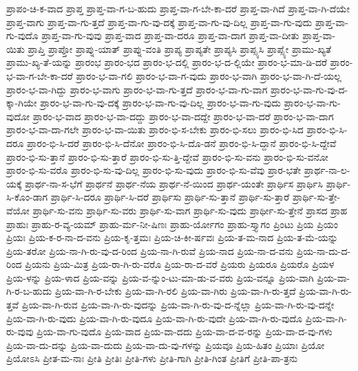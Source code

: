 {ಪ್ರಾಪಂ-ಚಿ-ಕ-ವಾದ
ಪ್ರಾಪ್ತ
ಪ್ರಾಪ್ತ-ವಾ-ಗ-ಬ-ಹುದು
ಪ್ರಾಪ್ತ-ವಾ-ಗ-ಬೇ-ಕಾ-ದರೆ
ಪ್ರಾಪ್ತ-ವಾ-ಗಿದೆ
ಪ್ರಾಪ್ತ-ವಾ-ಗಿ-ದೆಯೇ
ಪ್ರಾಪ್ತ-ವಾಗು
ಪ್ರಾಪ್ತ-ವಾ-ಗು-ತ್ತದೆ
ಪ್ರಾಪ್ತ-ವಾ-ಗು-ವು-ದಕ್ಕೆ
ಪ್ರಾಪ್ತ-ವಾ-ಗು-ವು-ದಿಲ್ಲ
ಪ್ರಾಪ್ತ-ವಾ-ಗು-ವುದು
ಪ್ರಾಪ್ತ-ವಾ-ಗು-ವುದೊ
ಪ್ರಾಪ್ತ-ವಾ-ಗು-ವುವು
ಪ್ರಾಪ್ತ-ವಾದ
ಪ್ರಾಪ್ತ-ವಾ-ದರೂ
ಪ್ರಾಪ್ತ-ವಾ-ದಾಗ
ಪ್ರಾಪ್ತ-ವಾ-ದೀತು
ಪ್ರಾಪ್ತ-ವಾ-ಯಿತು
ಪ್ರಾಪ್ತಿ
ಪ್ರಾಪ್ತೋ
ಪ್ರಾಪ್ನು-ಯಾತ್
ಪ್ರಾಪ್ನು-ವಂತಿ
ಪ್ರಾಪ್ಯ
ಪ್ರಾಪ್ಯತೇ
ಪ್ರಾಪ್ಯಸಿ
ಪ್ರಾಪ್ಸ್ಯಸಿ
ಪ್ರಾಪ್ಸ್ಯೇ
ಪ್ರಾಮು-ಖ್ಯತೆ
ಪ್ರಾಮು-ಖ್ಯ-ತೆ-ಯನ್ನು
ಪ್ರಾರಂಭ
ಪ್ರಾರಂ-ಭದ
ಪ್ರಾರಂ-ಭ-ದಲ್ಲಿ
ಪ್ರಾರಂ-ಭ-ದ-ಲ್ಲಿಯೇ
ಪ್ರಾರಂ-ಭ-ಮಾ-ಡಿ-ದರೆ
ಪ್ರಾರಂ-ಭ-ವಾ-ಗ-ಬೇ-ಕಾ-ದರೆ
ಪ್ರಾರಂ-ಭ-ವಾ-ಗಲಿ
ಪ್ರಾರಂ-ಭ-ವಾ-ಗ-ವುದು
ಪ್ರಾರಂ-ಭ-ವಾಗಿ
ಪ್ರಾರಂ-ಭ-ವಾ-ಗಿ-ದೆ-ಯಲ್ಲ
ಪ್ರಾರಂ-ಭ-ವಾ-ಗಿದ್ದು
ಪ್ರಾರಂ-ಭ-ವಾಗು
ಪ್ರಾರಂ-ಭ-ವಾ-ಗು-ತ್ತದೆ
ಪ್ರಾರಂ-ಭ-ವಾ-ಗು-ವಾಗ
ಪ್ರಾರಂ-ಭ-ವಾ-ಗು-ವು-ದ-ಕ್ಕಾ-ಗಿಯೇ
ಪ್ರಾರಂ-ಭ-ವಾ-ಗು-ವು-ದಕ್ಕೆ
ಪ್ರಾರಂ-ಭ-ವಾ-ಗು-ವು-ದಿಲ್ಲ
ಪ್ರಾರಂ-ಭ-ವಾ-ಗು-ವುದು
ಪ್ರಾರಂ-ಭ-ವಾ-ಗು-ವುದೋ
ಪ್ರಾರಂ-ಭ-ವಾದ
ಪ್ರಾರಂ-ಭ-ವಾ-ದದ್ದು
ಪ್ರಾರಂ-ಭ-ವಾ-ದದ್ದೇ
ಪ್ರಾರಂ-ಭ-ವಾ-ದರೆ
ಪ್ರಾರಂ-ಭ-ವಾ-ದಾಗ
ಪ್ರಾರಂ-ಭ-ವಾ-ದಾ-ಗಲೇ
ಪ್ರಾರಂ-ಭ-ವಾ-ಯಿತು
ಪ್ರಾರಂ-ಭಿ-ಸ-ಬೇಕು
ಪ್ರಾರಂ-ಭಿ-ಸಲು
ಪ್ರಾರಂ-ಭಿ-ಸಿದ
ಪ್ರಾರಂ-ಭಿ-ಸಿ-ದರೂ
ಪ್ರಾರಂ-ಭಿ-ಸಿ-ದರೆ
ಪ್ರಾರಂ-ಭಿ-ಸಿ-ದೆನೋ
ಪ್ರಾರಂ-ಭಿ-ಸಿ-ದೊ-ಡನೆ
ಪ್ರಾರಂ-ಭಿ-ಸಿ-ದ್ದಾನೆ
ಪ್ರಾರಂ-ಭಿ-ಸಿ-ದ್ದೇವೆ
ಪ್ರಾರಂ-ಭಿ-ಸು-ತ್ತಾನೆ
ಪ್ರಾರಂ-ಭಿ-ಸು-ತ್ತಾರೆ
ಪ್ರಾರಂ-ಭಿ-ಸು-ತ್ತಿ-ದ್ದೇವೆ
ಪ್ರಾರಂ-ಭಿ-ಸು-ವನು
ಪ್ರಾರಂ-ಭಿ-ಸು-ವನೋ
ಪ್ರಾರಂ-ಭಿ-ಸು-ವರೊ
ಪ್ರಾರಂ-ಭಿ-ಸು-ವು-ದಿಲ್ಲ
ಪ್ರಾರಂ-ಭಿ-ಸು-ವುದು
ಪ್ರಾರಂ-ಭಿ-ಸು-ವೆವು
ಪ್ರಾರ-ಭತೇ
ಪ್ರಾರ್ಥ-ನಾ-ಲ-ಯಕ್ಕೆ
ಪ್ರಾರ್ಥ-ನಾ-ಸ-ಭೆಗೆ
ಪ್ರಾರ್ಥನೆ
ಪ್ರಾರ್ಥ-ನೆಯ
ಪ್ರಾರ್ಥ-ನೆ-ಯಿಂದ
ಪ್ರಾರ್ಥ-ಯಂತೇ
ಪ್ರಾರ್ಥಿಸ
ಪ್ರಾರ್ಥಿಸಿ
ಪ್ರಾರ್ಥಿ-ಸಿ-ಕೊಂ-ಡಾಗ
ಪ್ರಾರ್ಥಿ-ಸಿ-ದರೂ
ಪ್ರಾರ್ಥಿ-ಸಿ-ದರೆ
ಪ್ರಾರ್ಥಿಸು
ಪ್ರಾರ್ಥಿ-ಸು-ತ್ತಾನೆ
ಪ್ರಾರ್ಥಿ-ಸು-ತ್ತಾರೆ
ಪ್ರಾರ್ಥಿ-ಸು-ತ್ತೇ-ವೆಯೋ
ಪ್ರಾರ್ಥಿ-ಸು-ವನು
ಪ್ರಾರ್ಥಿ-ಸು-ವರು
ಪ್ರಾರ್ಥಿ-ಸು-ವಾಗ
ಪ್ರಾರ್ಥಿ-ಸು-ವುದು
ಪ್ರಾರ್ಥೀ-ಸು-ತ್ತೇನೆ
ಪ್ರಾಸದ
ಪ್ರಾಹ
ಪ್ರಾಹುಃ
ಪ್ರಾಹು-ರ-ವ್ಯ-ಯಮ್
ಪ್ರಾಹು-ರ್ಮ-ನೀ-ಷಿಣಃ
ಪ್ರಾಹು-ರ್ಯೋಗಂ
ಪ್ರಾಹು-ಸ್ತ್ಯಾಗಂ
ಪ್ರಿಂಟು
ಪ್ರಿಯ
ಪ್ರಿಯಂ
ಪ್ರಿಯಃ
ಪ್ರಿಯ-ಕ-ರ-ನಾ-ದ-ವನು
ಪ್ರಿಯ-ಕೃ-ತ್ತಮಃ
ಪ್ರಿಯ-ಚಿ-ಕೀ-ರ್ಷವಃ
ಪ್ರಿಯ-ತ-ಮ-ನಾದ
ಪ್ರಿಯ-ತ-ಮೆ-ಯನ್ನು
ಪ್ರಿಯ-ತರೋ
ಪ್ರಿಯ-ನಾ-ಗಿ-ರು-ವು-ದ-ರಿಂದ
ಪ್ರಿಯ-ನಾ-ಗಿ-ರುವೆ
ಪ್ರಿಯ-ನಾದ
ಪ್ರಿಯ-ನಾ-ದ-ವನು
ಪ್ರಿಯ-ನಾ-ದು-ದ-ರಿಂದ
ಪ್ರಿಯನು
ಪ್ರಿಯ-ಮಿತ್ರ
ಪ್ರಿಯ-ರಾ-ಗಿ-ರು-ವರೊ
ಪ್ರಿಯ-ರಾ-ದ-ವರೆ
ಪ್ರಿಯರು
ಪ್ರಿಯರೂ
ಪ್ರಿಯರೊ
ಪ್ರಿಯಳ
ಪ್ರಿಯ-ಳನ್ನು
ಪ್ರಿಯ-ಳಾದ
ಪ್ರಿಯ-ವನ್ನು
ಪ್ರಿಯ-ವ-ನ್ನುಂ-ಟು-ಮಾ-ಡು-ವ-ವರು
ಪ್ರಿಯ-ವನ್ನೂ
ಪ್ರಿಯ-ವಾಗಿ
ಪ್ರಿಯ-ವಾ-ಗಿ-ರ-ಬ-ಹುದು
ಪ್ರಿಯ-ವಾ-ಗಿ-ರ-ಬೇಕು
ಪ್ರಿಯ-ವಾ-ಗಿ-ರಲಿ
ಪ್ರಿಯ-ವಾ-ಗಿರು
ಪ್ರಿಯ-ವಾ-ಗಿ-ರು-ತ್ತದೆ
ಪ್ರಿಯ-ವಾ-ಗಿ-ರು-ತ್ತವೆ
ಪ್ರಿಯ-ವಾ-ಗಿ-ರುವ
ಪ್ರಿಯ-ವಾ-ಗಿ-ರು-ವುದನ್ನು
ಪ್ರಿಯ-ವಾ-ಗಿ-ರು-ವು-ದ-ನ್ನೆಲ್ಲಾ
ಪ್ರಿಯ-ವಾ-ಗಿ-ರು-ವು-ದನ್ನೇ
ಪ್ರಿಯ-ವಾ-ಗಿ-ರು-ವುದು
ಪ್ರಿಯ-ವಾ-ಗಿ-ರು-ವುದೂ
ಪ್ರಿಯ-ವಾ-ಗಿ-ರು-ವುದೇ
ಪ್ರಿಯ-ವಾ-ಗಿ-ರು-ವುದೊ
ಪ್ರಿಯ-ವಾ-ಗಿ-ರು-ವುವು
ಪ್ರಿಯ-ವಾ-ಗು-ವುದೊ
ಪ್ರಿಯ-ವಾದ
ಪ್ರಿಯ-ವಾ-ದದು
ಪ್ರಿಯ-ವಾ-ದ-ವ-ರನ್ನು
ಪ್ರಿಯ-ವಾ-ದ-ವು-ಗಳು
ಪ್ರಿಯ-ವಾ-ದು-ದನ್ನು
ಪ್ರಿಯ-ವಾ-ದುದು
ಪ್ರಿಯ-ವಾ-ದು-ವು-ಗಳನ್ನು
ಪ್ರಿಯವೂ
ಪ್ರಿಯ-ಹಿತಂ
ಪ್ರಿಯಾಃ
ಪ್ರಿಯೋ
ಪ್ರಿಯೋಽಸಿ
ಪ್ರೀತ-ಮ-ನಾಃ
ಪ್ರೀತಿ
ಪ್ರೀತಿಃ
ಪ್ರೀತಿ-ಗಳು
ಪ್ರೀತಿ-ಗಾಗಿ
ಪ್ರೀತಿ-ಗಿಂತ
ಪ್ರೀತಿಗೆ
ಪ್ರೀತಿ-ಪಾ-ತ್ರನು
}
